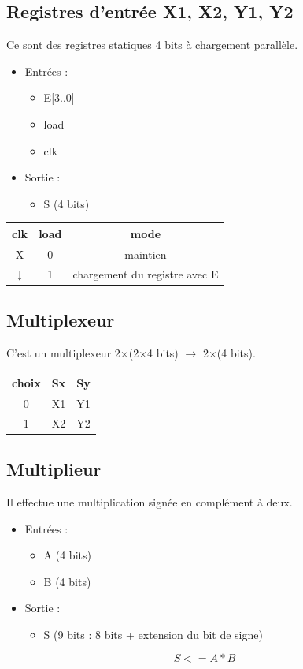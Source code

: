 \documentclass[a4paper]{report}
\begin{document}
\subsection{Registres d'entrée X1, X2, Y1, Y2}
Ce sont des registres statiques 4 bits à chargement parallèle.
\begin{itemize}
	\item Entrées :
	\begin{itemize}
		\item E[3..0]
		\item load
		\item clk
	\end{itemize}
	\item Sortie :
	\begin{itemize}
		\item S (4 bits)
	\end{itemize}
\end{itemize}

\begin{center}
	\begin{tabular}{|c|c|c|}
		\hline
		clk & load & mode \\
		\hline
		X & 0 & maintien \\
		\hline
		$\downarrow$ & 1 & chargement du registre avec E \\
		\hline
	\end{tabular}
\end{center}

\subsection{Multiplexeur}
C'est un multiplexeur 2$\times$(2$\times$4 bits) $\rightarrow$ 2$\times$(4 bits).
\begin{center}
	\begin{tabular}{|c|c|c|}
		\hline
		choix & Sx & Sy \\
		\hline
		0 & X1 & Y1 \\
		\hline
		1 & X2 & Y2 \\
		\hline
	\end{tabular}
\end{center}

\subsection{Multiplieur}
Il effectue une multiplication signée en complément à deux.
\begin{itemize}
	\item Entrées :
	\begin{itemize}
		\item A (4 bits)
		\item B (4 bits)
	\end{itemize}
	\item Sortie :
	\begin{itemize}
		\item S (9 bits : 8 bits + extension du bit de signe)
	\end{itemize}
\end{itemize}
\[
S <= A*B
\]
\end{document}
